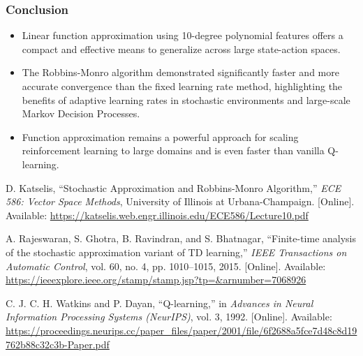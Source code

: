 \documentclass[10pt,twocolumn,letterpaper]{article}
\begin{document}
\subsubsection*{Conclusion}

\begin{itemize}
    \item Linear function approximation using 10-degree polynomial features offers a compact and effective means to generalize across large state-action spaces.
    \item The Robbins-Monro algorithm demonstrated significantly faster and more accurate convergence than the fixed learning rate method, highlighting the benefits of adaptive learning rates in stochastic environments and large-scale Markov Decision Processes.
    \item Function approximation remains a powerful approach for scaling reinforcement learning to large domains and is even faster than vanilla Q-learning.
\end{itemize}

\begin{thebibliography}{9}

D. Katselis, “Stochastic Approximation and Robbins-Monro Algorithm,” \textit{ECE 586: Vector Space Methods}, University of Illinois at Urbana-Champaign. [Online]. Available: \url{https://katselis.web.engr.illinois.edu/ECE586/Lecture10.pdf}

A. Rajeswaran, S. Ghotra, B. Ravindran, and S. Bhatnagar, “Finite-time analysis of the stochastic approximation variant of TD learning,” \textit{IEEE Transactions on Automatic Control}, vol. 60, no. 4, pp. 1010–1015, 2015. [Online]. Available: \url{https://ieeexplore.ieee.org/stamp/stamp.jsp?tp=&arnumber=7068926}

C. J. C. H. Watkins and P. Dayan, “Q-learning,” in \textit{Advances in Neural Information Processing Systems (NeurIPS)}, vol. 3, 1992. [Online]. Available: \url{https://proceedings.neurips.cc/paper_files/paper/2001/file/6f2688a5fce7d48c8d19762b88c32c3b-Paper.pdf}

\end{thebibliography}
\end{document}

